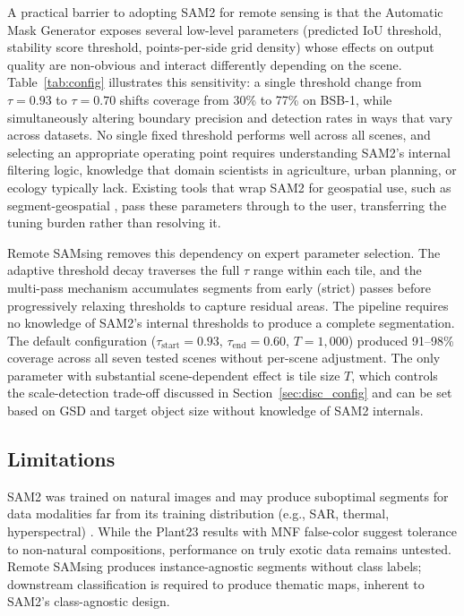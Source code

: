 \documentclass[review,11pt,authoryear]{elsarticle}
\begin{document}
A practical barrier to adopting SAM2 for remote sensing is that the Automatic Mask Generator exposes several low-level parameters (predicted IoU threshold, stability score threshold, points-per-side grid density) whose effects on output quality are non-obvious and interact differently depending on the scene. Table~\ref{tab:config} illustrates this sensitivity: a single threshold change from $\tau = 0.93$ to $\tau = 0.70$ shifts coverage from 30\% to 77\% on BSB-1, while simultaneously altering boundary precision and detection rates in ways that vary across datasets. No single fixed threshold performs well across all scenes, and selecting an appropriate operating point requires understanding SAM2's internal filtering logic, knowledge that domain scientists in agriculture, urban planning, or ecology typically lack. Existing tools that wrap SAM2 for geospatial use, such as segment-geospatial \citep{wu2023samgeo}, pass these parameters through to the user, transferring the tuning burden rather than resolving it.

Remote SAMsing removes this dependency on expert parameter selection. The adaptive threshold decay traverses the full $\tau$ range within each tile, and the multi-pass mechanism accumulates segments from early (strict) passes before progressively relaxing thresholds to capture residual areas. The pipeline requires no knowledge of SAM2's internal thresholds to produce a complete segmentation. The default configuration ($\tau_\text{start} = 0.93$, $\tau_\text{end} = 0.60$, $T = 1{,}000$) produced 91--98\% coverage across all seven tested scenes without per-scene adjustment. The only parameter with substantial scene-dependent effect is tile size $T$, which controls the scale-detection trade-off discussed in Section~\ref{sec:disc_config} and can be set based on GSD and target object size without knowledge of SAM2 internals.

\subsection{Limitations}
\label{sec:disc_limitations}

SAM2 was trained on natural images and may produce suboptimal segments for data modalities far from its training distribution (e.g., SAR, thermal, hyperspectral) \citep{zhang2025sam2survey}. While the Plant23 results with MNF false-color suggest tolerance to non-natural compositions, performance on truly exotic data remains untested. Remote SAMsing produces instance-agnostic segments without class labels; downstream classification is required to produce thematic maps, inherent to SAM2's class-agnostic design.
\end{document}
